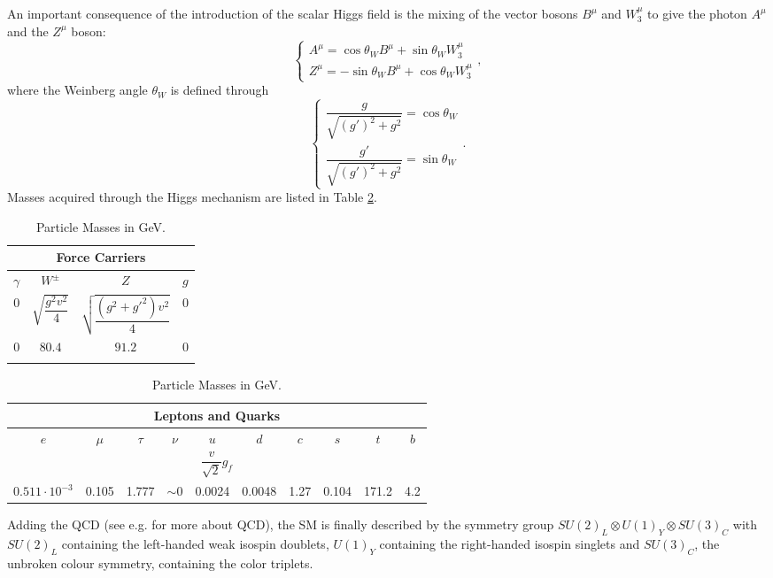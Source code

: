 An important consequence of the introduction of the scalar Higgs field is the mixing of the vector bosons $B^{\mu}$ and $W_{3}^{\mu}$ to give the photon $A^{\mu}$ and the $Z^{\mu}$ boson:\begin{equation}\label{eq:AZ}
\left \{ \begin{array}{ll}
A^{\mu} = \cos\theta_{W}B^{\mu} + \sin\theta_{W}W_{3}^{\mu}\\
Z^{\mu} = -\sin\theta_{W}B^{\mu} + \cos\theta_{W}W_{3}^{\mu}\end{array}\right. ,
\end{equation}where the Weinberg angle $\theta_{W}$ is defined through\begin{equation}\label{eq:weinb}
\left \{ \begin{array}{ll}
\dfrac{g}{\sqrt{(g')^{2}+g^{2}}} = \cos\theta_{W} \\
\dfrac{g'}{\sqrt{(g')^{2}+g^{2}}} = \sin\theta_{W} \end{array}\right. .
\end{equation} Masses acquired through the Higgs mechanism are listed in Table \ref{tab:mass}.
\begin{table}[htb]\centering\begin{tabular}{cccc}
\multicolumn{4}{c}{Force Carriers} \\ \midrule
$\gamma $ &$W^{\pm}$ &$Z$ &$g$ \\
$0$ & $\sqrt{\dfrac{g^{2}v^{2}}{4}} $& $\sqrt{\dfrac{(g^{2}+g'^{2})v^{2}}{4}} $&  $0$ \\
$0$ & $80.4$ & $91.2$ & $0$ \\\hline \hline\\
\end{tabular}

\begin{tabular}{cccccccccc}
\multicolumn{10}{c}{Leptons and Quarks} \\ \midrule
$e$ & $\mu$ &$\tau$ &$\nu$ & $u$ & $d$ & $c$ & $s$ &$ t$ & $b$ \\
\multicolumn{10}{c}{$\dfrac{v}{\sqrt{2}}g_{f}$} \\
$0.511\cdot10^{-3} $ & 0.105 & 1.777 & $\sim0$ & 0.0024 & 0.0048 & 1.27 & 0.104 & 171.2 & 4.2 \\\hline \hline
\end{tabular}\caption{Particle Masses in GeV.}\label{tab:mass} \end{table}

Adding the QCD (see e.g. \cite{Ecker} for more about QCD), the SM is finally described by the symmetry group $SU(2)_{L}\otimes U(1)_{Y}\otimes SU(3)_{C}$ with  $SU(2)_{L}$ containing the left-handed weak isospin doublets, $U(1)_{Y}$ containing the right-handed isospin singlets and $SU(3)_{C}$, the unbroken colour symmetry, containing the color triplets.


